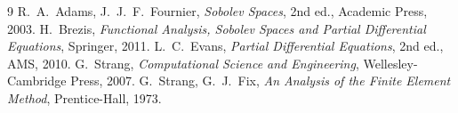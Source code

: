 \begin{chapterbib}{9}
 R.~A.~Adams, J.~J.~F.~Fournier, \emph{Sobolev Spaces}, 2nd ed., Academic Press, 2003.
 H.~Brezis, \emph{Functional Analysis, Sobolev Spaces and Partial Differential Equations}, Springer, 2011.
 L.~C.~Evans, \emph{Partial Differential Equations}, 2nd ed., AMS, 2010.
 G.~Strang, \emph{Computational Science and Engineering}, Wellesley-Cambridge Press, 2007.
 G.~Strang, G.~J.~Fix, \emph{An Analysis of the Finite Element Method}, Prentice-Hall, 1973.
\end{chapterbib}
